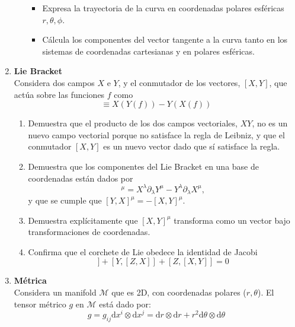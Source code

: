 \documentclass[../main]{subfiles}
\begin{document}
\begin{enumerate}
\begin{enumerate}[label=(\alph*)]
\begin{itemize}
            \item Expresa la trayectoria de la curva en coordenadas polares esféricas $r, \theta, \phi$.
            \item Cálcula los componentes del vector tangente a la curva tanto en los sistemas de coordenadas cartesianas y en polares esféricas.
        \end{itemize}
    \end{enumerate}
    \item \textbf{Lie Bracket} \\
    Considera dos campos $X$ e $Y$, y el conmutador de los vectores, $[X, Y]$, que actúa sobre las funciones $f$ como
    \begin{equation}
        [X, Y]\equiv X(Y(f))-Y(X(f))
    \end{equation}
    \begin{enumerate}[label=(\alph*)]
        \item Demuestra que el producto de los dos campos vectoriales, $XY$, no es un nuevo campo vectorial porque no satisface la regla de Leibniz, y que el conmutador $[X, Y]$ es un nuevo vector dado que sí satisface la regla.
        \item Demuestra que los componentes del Lie Bracket en una base de coordenadas están dados por 
        \begin{equation}
            [X, Y]^{\mu}=X^{\lambda}\partial_{\lambda}Y^{\mu}-Y^{\lambda}\partial_{\lambda}X^{\mu},
        \end{equation}
        y que se cumple que $[Y, X]^{\mu}=-[X, Y]^{\mu}$.
        \item Demuestra explícitamente que $[X, Y]^{\mu}$ transforma como un vector bajo transformaciones de coordenadas.
        \item Confirma que el corchete de Lie obedece la identidad de Jacobi
        \begin{equation}
            [X, [Y, Z]]+[Y, [Z, X]]+[Z, [X, Y]]=0
        \end{equation}
    \end{enumerate}
    \item \textbf{Métrica} \\
    Considera un manifold $\mathcal{M}$ que es 2D, con coordenadas polares ($r, \theta$). El tensor métrico $g$ en $\mathcal{M}$ está dado por:
    \begin{equation}
        g=g_{ij}\mathrm{d}x^{i}\otimes \mathrm{d}x^j=\mathrm{d}r\otimes \mathrm{d}r+r^2\mathrm{d}\theta\otimes\mathrm{d}\theta
    \end{equation}

\end{enumerate}
\end{document}
